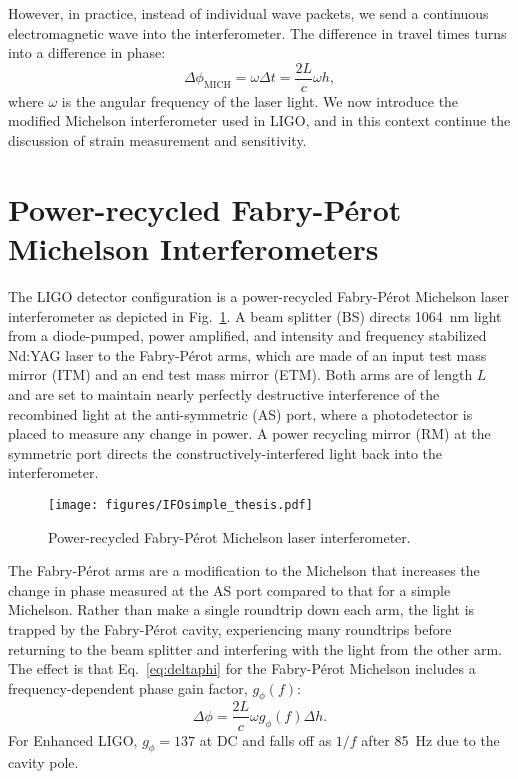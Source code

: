 However, in practice, instead of individual wave packets, we send a
continuous electromagnetic wave into the interferometer. The
difference in travel times turns into a difference in phase:
\begin{equation}
\Delta \phi_{\mathrm{MICH}} = \omega \Delta t = \frac{2 L}{c} \omega h,
\label{eq:deltaphi}
\end{equation}
where $\omega$ is the angular frequency of the laser light. We now
introduce the modified Michelson interferometer used in LIGO, and in
this context continue the discussion of strain measurement and
sensitivity.




\section{Power-recycled Fabry-P\'{e}rot Michelson Interferometers} 
The LIGO detector configuration is a power-recycled Fabry-P\'{e}rot
Michelson laser interferometer as depicted in
Fig.~\ref{fig:IFOschematic}. A beam splitter (BS) directs 1064~nm
light from a diode-pumped, power amplified, and intensity and
frequency stabilized Nd:YAG laser to the Fabry-P\'{e}rot arms, which are
made of an input test mass mirror (ITM) and an end test mass mirror
(ETM). Both arms are of length $L$ and are set to maintain nearly
perfectly destructive interference of the recombined light at the
anti-symmetric (AS) port, where a photodetector is placed to measure
any change in power. A power recycling mirror (RM) at the symmetric
port directs the constructively-interfered light back into the
interferometer.

\begin{figure}
\begin{centering}
\texttt{[image: figures/IFOsimple\_thesis.pdf]}
\caption[Power-recycled Fabry-P\'{e}rot Michelson laser
interferometer]{Power-recycled Fabry-P\'{e}rot Michelson laser
  interferometer.}
\label{fig:IFOschematic}
\end{centering}
\end{figure}

The Fabry-P\'{e}rot arms are a modification to the Michelson that
increases the change in phase measured at the AS port compared to that
for a simple Michelson. Rather than make a single roundtrip down each
arm, the light is trapped by the Fabry-P\'{e}rot cavity, experiencing many
roundtrips before returning to the beam splitter and interfering with
the light from the other arm. The effect is that Eq.~\ref{eq:deltaphi}
for the Fabry-P\'{e}rot Michelson includes a frequency-dependent phase
gain factor, $g_{\phi}(f)$:
\begin{equation}
\Delta \phi = \frac{2 L}{c} \omega g_{\phi}(f) \Delta h.
\label{eq:deltaphi}
\end{equation}
For Enhanced LIGO, $g_{\phi} = 137$ at DC and falls off as $1/f$ after
85~Hz due to the cavity pole.


